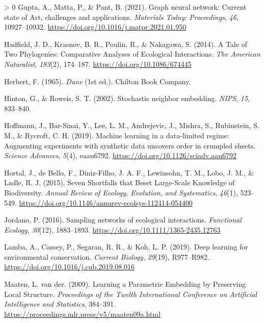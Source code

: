 \documentclass[10pt,oneside]{article}
\newlength{\cslhangindent}
\newenvironment{CSLReferences}[3] %
 {%
  \setlength{\parindent}{0pt}
  \ifodd #1 \everypar{\setlength{\hangindent}{\cslhangindent}}\ignorespaces\fi
  \ifnum #2 > 0
  \setlength{\parskip}{#2\baselineskip}
  \fi
 }%
 {}
\begin{document}
\begin{CSLReferences}{1}{0}
\leavevmode\hypertarget{ref-Gupta2021GraNeu}{}%
Gupta, A., Matta, P., \& Pant, B. (2021). Graph neural network: Current
state of Art, challenges and applications. \emph{Materials Today:
Proceedings}, \emph{46}, 10927--10932.
\url{https://doi.org/10.1016/j.matpr.2021.01.950}

\leavevmode\hypertarget{ref-Hadfield2014TalTwo}{}%
Hadfield, J. D., Krasnov, B. R., Poulin, R., \& Nakagawa, S. (2014). A
Tale of Two Phylogenies: Comparative Analyses of Ecological
Interactions. \emph{The American Naturalist}, \emph{183}(2), 174--187.
\url{https://doi.org/10.1086/674445}

\leavevmode\hypertarget{ref-Herbert1965Dun}{}%
Herbert, F. (1965). \emph{Dune} (1st ed.). Chilton Book Company.

\leavevmode\hypertarget{ref-Hinton2002StoNei}{}%
Hinton, G., \& Roweis, S. T. (2002). Stochastic neighbor embedding.
\emph{NIPS}, \emph{15}, 833--840.

\leavevmode\hypertarget{ref-Hoffmann2019MacLea}{}%
Hoffmann, J., Bar-Sinai, Y., Lee, L. M., Andrejevic, J., Mishra, S.,
Rubinstein, S. M., \& Rycroft, C. H. (2019). Machine learning in a
data-limited regime: Augmenting experiments with synthetic data uncovers
order in crumpled sheets. \emph{Science Advances}, \emph{5}(4),
eaau6792. \url{https://doi.org/10.1126/sciadv.aau6792}

\leavevmode\hypertarget{ref-Hortal2015SevSho}{}%
Hortal, J., de Bello, F., Diniz-Filho, J. A. F., Lewinsohn, T. M., Lobo,
J. M., \& Ladle, R. J. (2015). Seven Shortfalls that Beset Large-Scale
Knowledge of Biodiversity. \emph{Annual Review of Ecology, Evolution,
and Systematics}, \emph{46}(1), 523--549.
\url{https://doi.org/10.1146/annurev-ecolsys-112414-054400}

\leavevmode\hypertarget{ref-Jordano2016SamNet}{}%
Jordano, P. (2016). Sampling networks of ecological interactions.
\emph{Functional Ecology}, \emph{30}(12), 1883--1893.
\url{https://doi.org/10.1111/1365-2435.12763}

\leavevmode\hypertarget{ref-Lamba2019DeeLea}{}%
Lamba, A., Cassey, P., Segaran, R. R., \& Koh, L. P. (2019). Deep
learning for environmental conservation. \emph{Current Biology},
\emph{29}(19), R977--R982.
\url{https://doi.org/10.1016/j.cub.2019.08.016}

\leavevmode\hypertarget{ref-Maaten2009LeaPar}{}%
Maaten, L. van der. (2009). Learning a Parametric Embedding by
Preserving Local Structure. \emph{Proceedings of the Twelth
International Conference on Artificial Intelligence and Statistics},
384--391. \url{https://proceedings.mlr.press/v5/maaten09a.html}


\end{CSLReferences}
\end{document}
